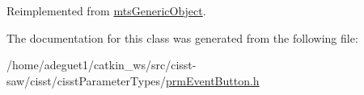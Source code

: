 Reimplemented from \hyperlink{classmts_generic_object_a4916a6c62ee5b167d7c93c88ab72523a}{mts\-Generic\-Object}.



The documentation for this class was generated from the following file\-:\begin{DoxyCompactItemize}
\item 
/home/adeguet1/catkin\-\_\-ws/src/cisst-\/saw/cisst/cisst\-Parameter\-Types/\hyperlink{prm_event_button_8h}{prm\-Event\-Button.\-h}\end{DoxyCompactItemize}
